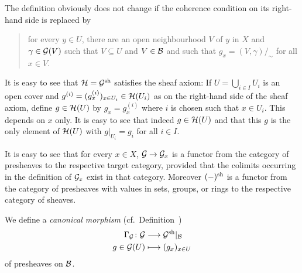 \documentclass[a4paper,parskip=half,numbers=enddot, DIV=12]{scrreprt}
\begin{document}
\begin{rem*}    
    \begin{alphanumerate}
      \item 
        The definition  obviously does not change if the coherence condition on its right-hand side is replaced by 
        \begin{quote}
            for every $y\in U$, there are an open neighbourhood $V$ of $y$ in $X$ and $\gamma\in \mathcal{G}(V)$ such that $V\subseteq U$ and $V\in\mathcal{B}$ and such that $g_x =(V,\gamma)/_\sim$ for all $x\in V$.
        \end{quote}
      \item 
        It is easy to see that $\mathcal{H}=\mathcal{G}^{\mathrm{sh}}$ satisfies the sheaf axiom: If $U = \bigcup_{i\in I} U_i$ is an open cover and $g^{(i)} = (g^{(i)}_x)_{x\in U_i}\in \mathcal{H}(U_i)$ as on the right-hand side of the sheaf axiom, define $g\in \mathcal{H}(U)$ by $g_x = g_x^{(i)}$ where $i$ is chosen such that $x\in U_i$. This depends on $x$ only. It is easy to see that indeed $g\in \mathcal{H}(U)$ and that this $g$ is the only element of $\mathcal{H}(U)$ with $g|_{U_i} = g_i$ for all $i\in I$.
      \item
        It is easy to see that for every $x\in X$, $\mathcal{G}\to \mathcal{G}_x$ is a functor from the category of presheaves to the respective target category, provided that the colimits occurring in the definition of $\mathcal{G}_x$ exist in that category. Moreover $(-)^{\mathrm{sh}}$ is a functor from the category of presheaves with values in sets, groups, or rings to the respective category of sheaves.
    \end{alphanumerate}
\end{rem*}
We define a \emph{canonical morphism} (cf.\ Definition~)
\begin{align*}
    \Gamma_\Gg\colon\Gg&\morphism \Gg^\sh|_\Bb\\
    g\in \Gg(U) &\longmapsto (g_x)_{x\in U}
\end{align*}
of presheaves on $\mathcal{B}$.
\end{document}
